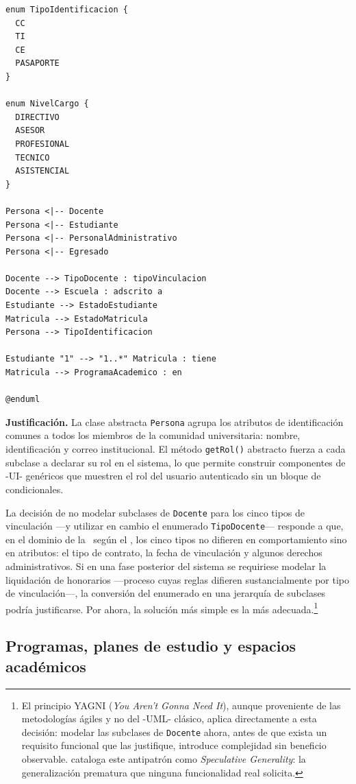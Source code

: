 \begin{lstlisting}
enum TipoIdentificacion {
  CC
  TI
  CE
  PASAPORTE
}

enum NivelCargo {
  DIRECTIVO
  ASESOR
  PROFESIONAL
  TECNICO
  ASISTENCIAL
}

Persona <|-- Docente
Persona <|-- Estudiante
Persona <|-- PersonalAdministrativo
Persona <|-- Egresado

Docente --> TipoDocente : tipoVinculacion
Docente --> Escuela : adscrito a
Estudiante --> EstadoEstudiante
Matricula --> EstadoMatricula
Persona --> TipoIdentificacion

Estudiante "1" --> "1..*" Matricula : tiene
Matricula --> ProgramaAcademico : en

@enduml
\end{lstlisting}

\textbf{Justificación.} La clase abstracta \texttt{Persona} agrupa los
atributos de identificación comunes a todos los miembros de la comunidad
universitaria: nombre, identificación y correo institucional. El método
\texttt{getRol()} abstracto fuerza a cada subclase a declarar su rol en
el sistema, lo que permite construir componentes de -UI- genéricos que
muestren el rol del usuario autenticado sin un bloque de condicionales.

La decisión de no modelar subclases de \texttt{Docente} para los cinco tipos
de vinculación ---y utilizar en cambio el enumerado \texttt{TipoDocente}---
responde a que, en el dominio de la \ud\ según el \acuerdo, los cinco tipos
no difieren en comportamiento sino en atributos: el tipo de contrato,
la fecha de vinculación y algunos derechos administrativos. Si en una fase
posterior del sistema se requiriese modelar la liquidación de honorarios
---proceso cuyas reglas difieren sustancialmente por tipo de vinculación---,
la conversión del enumerado en una jerarquía de subclases podría justificarse.
Por ahora, la solución más simple es la más adecuada.\footnote{%
  El principio \textsc{YAGNI} (\textit{You Aren't Gonna Need It}), aunque
  proveniente de las metodologías ágiles y no del -UML- clásico, aplica
  directamente a esta decisión: modelar las subclases de \texttt{Docente}
  ahora, antes de que exista un requisito funcional que las justifique,
  introduce complejidad sin beneficio observable. \textcite{Fowler2018}
  cataloga este antipatrón como \textit{Speculative Generality}: la
  generalización prematura que ninguna funcionalidad real solicita.}

\subsection{Programas, planes de estudio y espacios académicos}
\label{subsec:modelo-programas}

